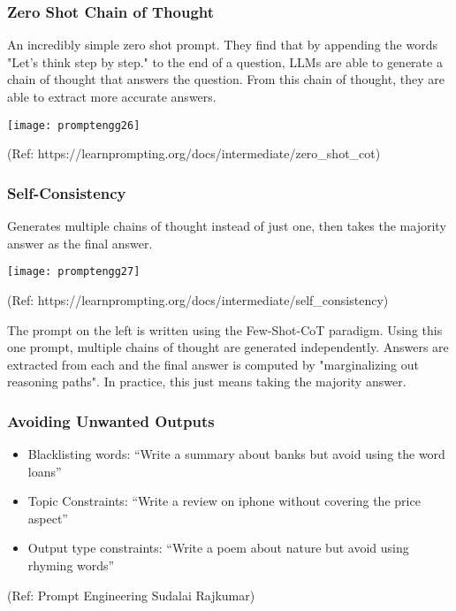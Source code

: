\begin{frame}[fragile]\frametitle{Zero Shot Chain of Thought}

An incredibly simple zero shot prompt. They find that by appending the words "Let's think step by step." to the end of a question, LLMs are able to generate a chain of thought that answers the question. From this chain of thought, they are able to extract more accurate answers.

\begin{center}
\texttt{[image: promptengg26]}

{\tiny (Ref: https://learnprompting.org/docs/intermediate/zero\_shot\_cot)}

\end{center}		

\end{frame}

\begin{frame}[fragile]\frametitle{Self-Consistency}

Generates multiple chains of thought instead of just one, then takes the majority answer as the final answer.

\begin{center}
\texttt{[image: promptengg27]}

{\tiny (Ref: https://learnprompting.org/docs/intermediate/self\_consistency)}

\end{center}		

The prompt on the left is written using the Few-Shot-CoT paradigm. Using this one prompt, multiple chains of thought are generated independently. Answers are extracted from each and the final answer is computed by "marginalizing out reasoning paths". In practice, this just means taking the majority answer.

\end{frame}

\begin{frame}[fragile]\frametitle{ Avoiding Unwanted Outputs}


\begin{itemize}
\item  Blacklisting words: ``Write a summary about banks but avoid using the word loans''
\item Topic Constraints: ``Write a review on iphone without covering the price aspect''
\item Output type constraints: ``Write a poem about nature but avoid using rhyming words''
\end{itemize}	 

		
		
{\tiny (Ref: Prompt Engineering Sudalai Rajkumar)}


\end{frame}



